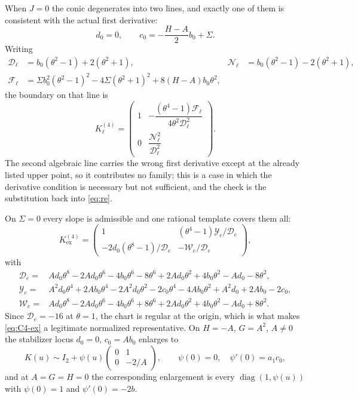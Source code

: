 \documentclass[11pt,reqno]{amsart}
\theoremstyle{plain}
\theoremstyle{definition}
\theoremstyle{remark}
\numberwithin{equation}{section}
\providecommand{\diag}{\operatorname{diag}}
\newcommand{\Id}{I_2}
\begin{document}
When $J=0$ the conic degenerates into two lines, and exactly one of them is
consistent with the actual first derivative:
\begin{equation}
d_0=0,\qquad c_0=-\frac{H-A}{2}b_0+\Sigma.       \label{eq:C4-line-condition}
\end{equation}
Writing
\begin{align}
\mathcal D_\ell&=b_0(\theta^2-1)+2(\theta^2+1),&
\mathcal N_\ell&=b_0(\theta^2-1)-2(\theta^2+1),\nonumber\\
\mathcal F_\ell&=\Sigma b_0^2(\theta^2-1)^2-4\Sigma(\theta^2+1)^2
+8(H-A)b_0\theta^2,
\label{eq:C4-line-aux}
\end{align}
the boundary on that line is
\begin{equation}
K_\ell^{(4)}=\begin{pmatrix}
1&-\dfrac{(\theta^4-1)\mathcal F_\ell}{4\theta^2\mathcal D_\ell^2}\\[2mm]
0&\dfrac{\mathcal N_\ell^2}{\mathcal D_\ell^2}
\end{pmatrix}.                                      \label{eq:C4-line}
\end{equation}
The second algebraic line carries the wrong first derivative except at the
already listed upper point, so it contributes no family; this is a case in which
the derivative condition is necessary but not sufficient, and the check is the
substitution back into \cref{eq:re}.

On $\Sigma=0$ every slope is admissible and one rational template covers them all:
\begin{equation}
K_{\mathrm{ex}}^{(4)}=\begin{pmatrix}
1&(\theta^4-1)\mathcal Y_e/\mathcal D_e\\
-2d_0(\theta^8-1)/\mathcal D_e&-\mathcal W_e/\mathcal D_e
\end{pmatrix},                                      \label{eq:C4-ex}
\end{equation}
with
\begin{align}
\mathcal D_e={}&Ad_0\theta^8-2Ad_0\theta^6-4b_0\theta^6-8\theta^6
+2Ad_0\theta^2+4b_0\theta^2-Ad_0-8\theta^2,\nonumber\\
\mathcal Y_e={}&A^2d_0\theta^4+2Ab_0\theta^4-2A^2d_0\theta^2-2c_0\theta^4
-4Ab_0\theta^2+A^2d_0+2Ab_0-2c_0,\nonumber\\
\mathcal W_e={}&Ad_0\theta^8-2Ad_0\theta^6-4b_0\theta^6+8\theta^6
+2Ad_0\theta^2+4b_0\theta^2-Ad_0+8\theta^2.
\label{eq:C4-ex-aux}
\end{align}
Since $\mathcal D_e=-16$ at $\theta=1$, the chart is regular at the origin, which
is what makes \cref{eq:C4-ex} a legitimate normalized representative. On
$H=-A$, $G=A^2$, $A\ne0$ the stabilizer locus $d_0=0$, $c_0=Ab_0$ enlarges to
\begin{equation}
K(u)\sim \Id+\psi(u)\begin{pmatrix}0&1\\0&-2/A\end{pmatrix},
\qquad \psi(0)=0,\quad \psi'(0)=a_1c_0,                \label{eq:C4-ex-fun}
\end{equation}
and at $A=G=H=0$ the corresponding enlargement is every $\diag(1,\psi(u))$ with
$\psi(0)=1$ and $\psi'(0)=-2b$.
\end{document}
